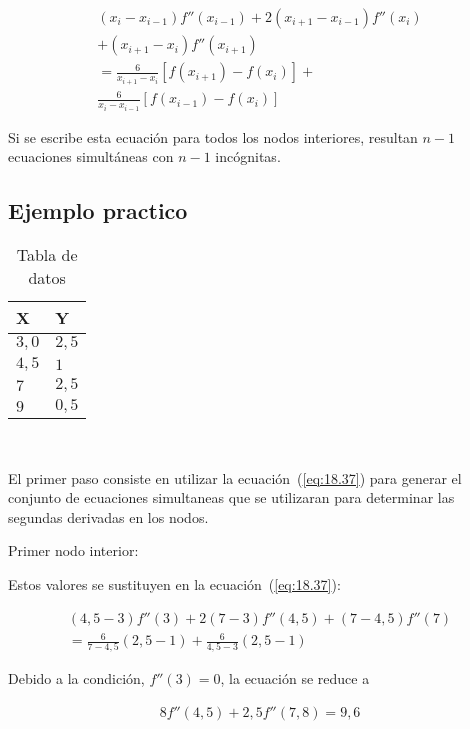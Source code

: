 \documentclass[conference]{IEEEtran}
\begin{document}
\begin{multline}
	(x_{i} - x_{i - 1})f''(x_{i - 1}) + 2(x_{i + 1} - x_{i - 1})f''(x_{i}) \\
	+ (x_{i + 1} - x_{i})f''(x_{i + 1}) \\
	= \frac{6}{x_{i + 1} - x_{i}}[f(x_{i + 1}) - f(x_{i})] + \\
	\frac{6}{x_{i} - x_{i - 1}}[f(x_{i - 1}) - f(x_{i})]
	\label{eq:18.37}
\end{multline}

Si se escribe esta ecuación para todos los nodos interiores,
resultan $n - 1$ ecuaciones simultáneas con $n - 1$ incógnitas.

\subsection*{Ejemplo practico}

\begin{table}[H]
	\begin{tabularx}{\linewidth}{|>{\centering\arraybackslash}X|>{\centering\arraybackslash}X|}
		\hline
		\textbf{X} & \textbf{Y} \\ \hline
		$3,0$      & $2,5$      \\ \hline
		$4,5$      & $1$        \\ \hline
		$7$        & $2,5$      \\ \hline
		$9$        & $0,5$      \\ \hline
	\end{tabularx}
	\label{tab:ejemplo_trazadores_cubicos}~\caption{Tabla de datos}
\end{table}


El primer paso consiste en utilizar la ecuación~(\ref{eq:18.37})
para generar el conjunto de ecuaciones simultaneas que se
utilizaran para determinar las segundas derivadas en los nodos.

Primer nodo interior:

Estos valores se sustituyen en la ecuación~(\ref{eq:18.37}):

\begin{multline*}
	(4,5 - 3)f''(3) + 2(7 - 3)f''(4,5) + (7 - 4,5)f''(7) \\
	= \frac{6}{7 - 4,5}(2,5 - 1) + \frac{6}{4,5 - 3}(2,5 - 1)
\end{multline*}

Debido a la condición, $f''(3) = 0$, la ecuación se reduce a

\begin{align*}
	8f''(4,5) + 2,5f''(7,8)  = 9,6
\end{align*}
\end{document}
